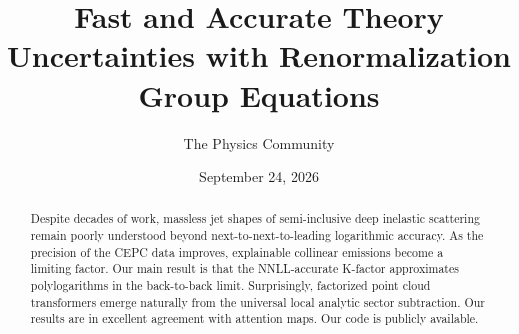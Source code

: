 \documentclass[11pt]{article}
\title{Fast and Accurate Theory Uncertainties with Renormalization Group Equations}
\author{The Physics Community}
\date{September 24, 2026}
\numberwithin{equation}{section}
\theoremstyle{definition}
\theoremstyle{remark}
\begin{document}
\maketitle
\begin{abstract}
Despite decades of work, massless jet shapes of semi-inclusive deep
inelastic scattering remain poorly understood beyond
next-to-next-to-leading logarithmic accuracy. As the precision of the
CEPC data improves, explainable collinear emissions become a limiting
factor. Our main result is that the NNLL-accurate K-factor approximates
polylogarithms in the back-to-back limit. Surprisingly, factorized point
cloud transformers emerge naturally from the universal local analytic
sector subtraction. Our results are in excellent agreement with
attention maps. Our code is publicly available.
\end{abstract}
\tableofcontents





\nocite{*}


\end{document}
